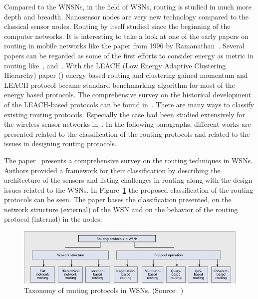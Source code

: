 \documentclass[12pt, oneandhalf, chaparabic, sees, ms]{metu}
\begin{document}
Compared to the WNSNs, in the field of WSNs, routing is studied in much more depth and breadth. Nanosensor nodes are very new technology compared
to the classical sensor nodes. Routing by itself studied since the beginning of the computer networks.
It is interesting to take a look at one of the early papers on routing in mobile networks like the paper from 1996 by Ramanathan~\cite{ramanathan1996}.
Several papers can be regarded as some of the first efforts to consider energy as metric in routing like~\cite{singh1998, rodoplu1999, stoj2000}, and~\cite{stoj2001}.
With the LEACH (Low Energy Adaptive Clustering Hierarchy) paper (\cite{heinzelman2000}) energy based routing and clustering gained momentum and LEACH protocol
became standard benchmarking algorithm for most of the energy based protocols. The comprehensive survey on the historical development of the LEACH-based protocols
can be found in~\cite{singh2017}.
There are many ways to classify existing routing protocols.  
Especially the case had been studied extensively for the wireless sensor networks in~\cite{kamal2004, bazzi2015, pantazis2013, sarkar2016}. 
In the following paragraphs, different works are presented related to the classification of the routing protocols and related to the 
issues in designing routing protocols.



The paper~\cite{kamal2004} presents a comprehensive survey on the routing techniques in WSNs. Authors provided a framework for their classification by
describing the architecture of the sensors and listing challenges in routing along with the design issues related to the WSNs. In Figure~\ref{fig:kamal-tax} the proposed
classification of the routing protocols can be seen. 
The paper bases the classification presented, on the network structure (external) of the WSN and on the behavior of the routing protocol (internal) in the nodes.
% 
%
%
\begin{figure}[!htbp]
 \begin{center}
  \includegraphics[width=\textwidth]{kamal-tax.png}
 \end{center}
 \caption{Taxonomy of routing protocols in WSNs. (Source:~\protect\cite{kamal2004})}
  \label{fig:kamal-tax}
\end{figure}
% 
%
%
\end{document}
